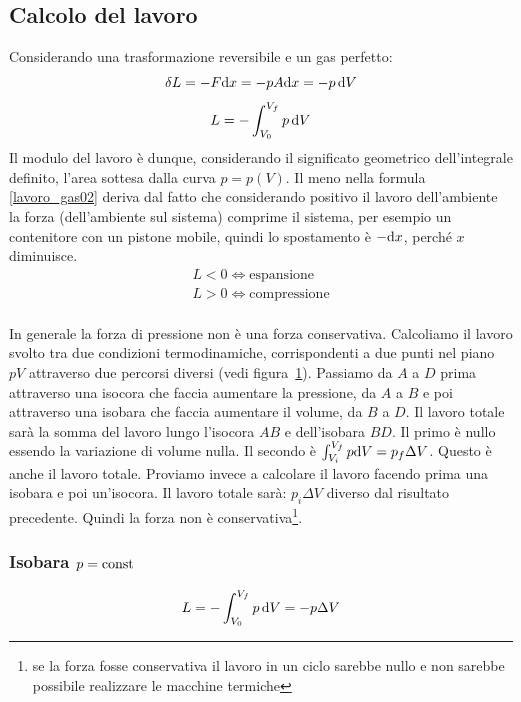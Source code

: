 \subsection{Calcolo del lavoro}
Considerando una trasformazione reversibile e un gas perfetto:
\[\delta L=-F\mathrm{d} x=-pA\mathrm{d} x=-p\,\mathrm{d} V\]
\begin{equation}
   L=-\int_{V_0}^{V_f} p\,\mathrm{d} V
   \label{lavoro_gas02}
\end{equation}
Il modulo del lavoro è dunque, considerando il significato geometrico dell'integrale definito, l'area sottesa dalla curva $p=p(V)$. Il meno nella formula \eqref{lavoro_gas02} deriva dal fatto che considerando positivo il lavoro dell'ambiente la forza (dell'ambiente sul sistema) comprime il sistema, per esempio un contenitore con un pistone mobile, quindi lo spostamento è $-\mathrm{d} x$, perché $x$ diminuisce.
\[\begin{array}{l}
      L<0 \Leftrightarrow \text{espansione}   \\
      L>0 \Leftrightarrow \text{compressione} \\
   \end{array}\]

In generale la forza di pressione non è una forza conservativa. Calcoliamo il lavoro svolto tra due condizioni termodinamiche, corrispondenti a due punti nel piano $pV$ attraverso due percorsi diversi (vedi figura~\ref{fig:forza_pressione}). Passiamo da $A$ a $D$ prima attraverso una isocora che faccia aumentare la pressione, da $A$ a $B$ e poi attraverso una isobara che faccia aumentare il volume, da $B$ a $D$. Il lavoro totale sarà la somma del lavoro lungo l'isocora $AB$ e dell'isobara $BD$. Il primo è nullo essendo la variazione di volume nulla. Il secondo è $\int_{V_i}^{V_f} p\mathrm{d} V=p_f \Delta V$. Questo è anche il lavoro totale. Proviamo invece a calcolare il lavoro facendo prima una isobara e poi un'isocora. Il lavoro totale sarà: $p_i\Delta V$ diverso dal risultato precedente. Quindi la forza non è conservativa\footnote{se la forza fosse conservativa il lavoro in un ciclo sarebbe nullo e non sarebbe possibile realizzare le macchine termiche}.
\begin{figure}[htbp]
   \centering
   \label{fig:forza_pressione}
\end{figure}

\subsubsection{Isobara $p=\text{const}$}
\begin{equation}
   L=-\int_{V_0}^{V_f} p\,\mathrm{d} V=-p\Delta V
\end{equation}
